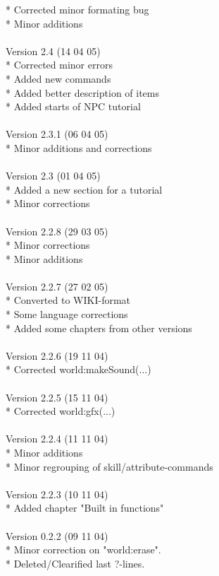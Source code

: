 \documentclass[a4paper,10pt,makeidx]{scrreprt}
\begin{document}
* Corrected minor formating bug\\
* Minor additions\\
\\
Version 2.4 (14 04 05)\\
* Corrected minor errors\\
* Added new commands\\
* Added better description of items\\
* Added starts of NPC tutorial\\
\\
Version 2.3.1 (06 04 05)\\
* Minor additions and corrections\\
\\
Version 2.3 (01 04 05)\\
* Added a new section for a tutorial\\
* Minor corrections\\
\\
Version 2.2.8 (29 03 05)\\
* Minor corrections\\
* Minor additions\\
\\
Version 2.2.7 (27 02 05)\\
* Converted to WIKI-format\\
* Some language corrections\\
* Added some chapters from other versions\\
\\
Version 2.2.6 (19 11 04)\\
* Corrected world:makeSound(...)\\
\\
Version 2.2.5 (15 11 04)\\
* Corrected world:gfx(...)\\
\\
Version 2.2.4 (11 11 04)\\
* Minor additions\\
* Minor regrouping of skill/attribute-commands\\
\\
Version 2.2.3 (10 11 04)\\
* Added chapter "Built in functions"\\
\\
Version 0.2.2 (09 11 04)\\
* Minor correction on "world:erase".\\
* Deleted/Clearified last ?-lines.\\
\end{document}
